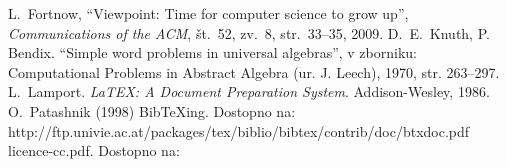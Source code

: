 \documentclass[a4paper, 12pt]{book}
\newcommand{\BibTeX}{{\sc Bib}\TeX}
\begin{document}
\begin{thebibliography}{99}
 L.\ Fortnow, ``Viewpoint: Time for computer science to grow up'',
{\it Communications of the ACM}, št.\ 52, zv.\ 8, str.\ 33--35, 2009.
 D.\ E.\ Knuth, P. Bendix. ``Simple word problems in universal algebras'', v zborniku: Computational Problems in Abstract Algebra (ur. J. Leech), 1970, str. 263--297.
 L.\ Lamport. {\it LaTEX: A Document Preparation System}. Addison-Wesley, 1986.
 O.\ Patashnik (1998) \BibTeX{}ing. 
Dostopno na:\\ http://ftp.univie.ac.at/packages/tex/biblio/bibtex/contrib/doc/btxdoc.pdf
 licence-cc.pdf. Dostopno na: 
\end{thebibliography}
\end{document}
